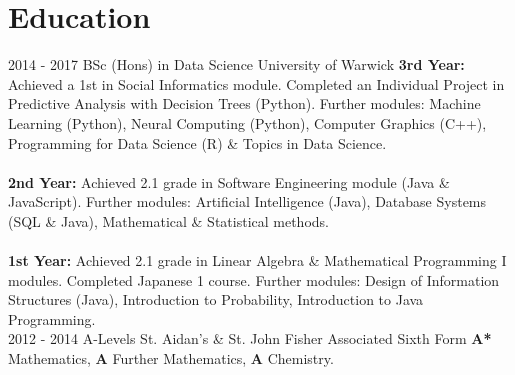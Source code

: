 \documentclass[]{friggeri-cv}
\begin{document}
\section{Education}
\begin{entrylist}
  \entry %
    {2014 - 2017}
    {BSc (Hons) in Data Science}
    {University of Warwick}
    {\textbf{3rd Year:} Achieved a 1st in Social Informatics module. Completed an Individual Project in Predictive Analysis with Decision Trees (Python). Further modules: Machine Learning (Python), Neural Computing (Python), Computer Graphics (C++), Programming for Data Science (R) \& Topics in Data Science.\\\\
    \textbf{2nd Year:} Achieved 2.1 grade in Software Engineering module (Java \& JavaScript). Further modules: Artificial Intelligence (Java), Database Systems (SQL \& Java), Mathematical \& Statistical methods.\\\\
    \textbf{1st Year:} Achieved 2.1 grade in Linear Algebra \& Mathematical Programming I modules. Completed Japanese 1 course. Further modules: Design of Information Structures (Java), Introduction to Probability, Introduction to Java Programming.}\\
  \entry %
    {2012 - 2014}
    {A-Levels}
    {St. Aidan's \& St. John Fisher Associated Sixth Form}
    {\textbf{A*} Mathematics, \textbf{A} Further Mathematics, \textbf{A} Chemistry.}
\end{entrylist}
\end{document}
